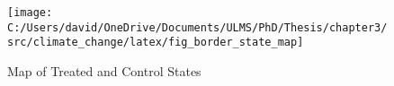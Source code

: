 \begin{figure}[H]
    \centering
    \texttt{[image: C:/Users/david/OneDrive/Documents/ULMS/PhD/Thesis/chapter3/src/climate\_change/latex/fig\_border\_state\_map]}
    \caption{Map of Treated and Control States}
    \label{fig:border-state-map}
\end{figure}